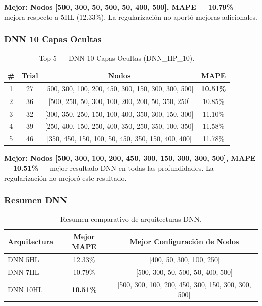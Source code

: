 \documentclass{article}
\begin{document}
\textbf{Mejor: Nodos [500, 300, 50, 500, 50, 400, 500], MAPE = 10.79\%} — mejora respecto a 5HL (12.33\%). La regularización no aportó mejoras adicionales.

\subsubsection{DNN 10 Capas Ocultas}

\begin{table}[htbp]
\centering
\caption{Top 5 — DNN 10 Capas Ocultas (DNN\_HP\_10).}
\label{tab:dnn10}
\begin{tabular}{cccc}
\hline
\# & Trial & Nodos & MAPE \\
\hline
1 & 27 & [500, 300, 100, 200, 450, 300, 150, 300, 300, 500] & \textbf{10.51\%} \\
2 & 36 & [500, 250, 50, 300, 100, 200, 200, 50, 350, 250] & 10.85\% \\
3 & 32 & [300, 350, 250, 150, 100, 400, 350, 300, 150, 300] & 11.10\% \\
4 & 39 & [250, 400, 150, 250, 400, 350, 250, 350, 100, 350] & 11.58\% \\
5 & 46 & [350, 450, 150, 100, 50, 450, 350, 150, 400, 400] & 11.78\% \\
\hline
\end{tabular}
\end{table}

\textbf{Mejor: Nodos [500, 300, 100, 200, 450, 300, 150, 300, 300, 500], MAPE = 10.51\%} — mejor resultado DNN en todas las profundidades. La regularización no mejoró este resultado.

\subsubsection{Resumen DNN}

\begin{table}[htbp]
\centering
\caption{Resumen comparativo de arquitecturas DNN.}
\label{tab:dnn-summary}
\begin{tabular}{lcc}
\hline
Arquitectura & Mejor MAPE & Mejor Configuración de Nodos \\
\hline
DNN 5HL  & 12.33\% & [400, 50, 300, 100, 250] \\
DNN 7HL  & 10.79\% & [500, 300, 50, 500, 50, 400, 500] \\
DNN 10HL & \textbf{10.51\%} & [500, 300, 100, 200, 450, 300, 150, 300, 300, 500] \\
\hline
\end{tabular}
\end{table}
\end{document}
